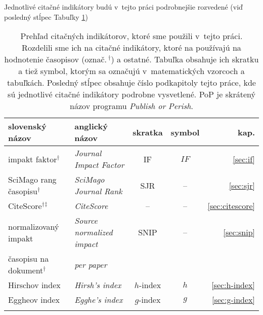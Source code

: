 Jednotlivé citačné indikátory budú v~tejto práci podrobnejšie
rozvedené (viď posledný stĺpec Tabuľky \ref{tab:indicators.review})

\begin{table}
  \caption[Prehľad citačných indikátorov]{Prehľad citačných indikátorov, ktoré
  sme použili v~tejto práci. Rozdelili sme ich na citačné indikátory, ktoré na
  používajú na hodnotenie časopisov (označ.\,$^\dagger$) a ostatné. Tabuľka
  obsahuje ich skratku a tiež symbol, ktorým sa označujú v~matematických
  vzorcoch a tabuľkách. Posledný stĺpec  obsahuje číslo podkapitoly
  tejto práce, kde sú jednotlivé citačné indikátory podrobne vysvetlené. PoP je
  skrátený názov programu \emph{Publish or Perish}.}
  \label{tab:indicators.review}
  \centering\small
  \begin{tabularx}{\textwidth}{llccr}
    \toprule\noalign{\vspace{.3ex}}
    slovenský  názov                & anglický názov                         & skratka                 & symbol                & kap.                 \\[0.3ex]
    \midrule\noalign{\vspace{.5ex}}
    impakt faktor$^\dagger$         & \emph{Journal Impact Factor}           & IF                      & $\mathit{IF}$         &  \ref{sec:if}        \\[0.5ex]
    SciMago rang časopisu$^\dagger$ & \emph{SciMago Journal Rank}            & SJR                     & --                    &  \ref{sec:sjr}       \\[0.5ex]
    CiteScore$^\dagger$$^\ddagger$  & \emph{CiteScore}                       & --                      & --                    &  \ref{sec:citescore} \\[0.5ex]
    normalizovaný impakt            & \emph{Source normalized impact}        & SNIP                    & --                    &  \ref{sec:snip}      \\[-0.25ex]
    časopisu  na dokument$^\dagger$ & \emph{per paper}                       &                         &                       &                      \\[0.5ex]
    Hirschov index                  & \emph{Hirsh's index}                   & $h$-index               & $h$                   &  \ref{sec:h-index}   \\[1.5ex]
    Eggheov index                   & \emph{Egghe's index}                   & $g$-index               & $g$                   &  \ref{sec:g-index}   \\[0.5ex]
$$
\end{tabularx}
\end{table}
